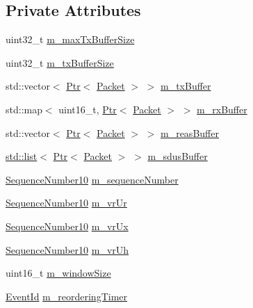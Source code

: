 \subsection*{Private Attributes}
\begin{DoxyCompactItemize}
\item 
uint32\+\_\+t \hyperlink{classns3_1_1LteRlcUm_ad65c6605ca578b8085d9f40f89265ea3}{m\+\_\+max\+Tx\+Buffer\+Size}
\item 
uint32\+\_\+t \hyperlink{classns3_1_1LteRlcUm_a22ba9f6bd98fd3b905155ae0d0182b0d}{m\+\_\+tx\+Buffer\+Size}
\item 
std\+::vector$<$ \hyperlink{classns3_1_1Ptr}{Ptr}$<$ \hyperlink{classns3_1_1Packet}{Packet} $>$ $>$ \hyperlink{classns3_1_1LteRlcUm_ac2c10aa57585dbea3797d651f3dce7be}{m\+\_\+tx\+Buffer}
\item 
std\+::map$<$ uint16\+\_\+t, \hyperlink{classns3_1_1Ptr}{Ptr}$<$ \hyperlink{classns3_1_1Packet}{Packet} $>$ $>$ \hyperlink{classns3_1_1LteRlcUm_aa4611282929afb798d591eafca1e6adb}{m\+\_\+rx\+Buffer}
\item 
std\+::vector$<$ \hyperlink{classns3_1_1Ptr}{Ptr}$<$ \hyperlink{classns3_1_1Packet}{Packet} $>$ $>$ \hyperlink{classns3_1_1LteRlcUm_a9d886a26e8b8318d5d110eb3da537b0c}{m\+\_\+reas\+Buffer}
\item 
\hyperlink{openflow-interface_8h_afd9bcfa176617760671b67580f536fa7}{std\+::list}$<$ \hyperlink{classns3_1_1Ptr}{Ptr}$<$ \hyperlink{classns3_1_1Packet}{Packet} $>$ $>$ \hyperlink{classns3_1_1LteRlcUm_a8c214e654b315fe09e26db669a6af268}{m\+\_\+sdus\+Buffer}
\item 
\hyperlink{classns3_1_1SequenceNumber10}{Sequence\+Number10} \hyperlink{classns3_1_1LteRlcUm_afd06062cf128aecdc2f7c3f29ea8a8ad}{m\+\_\+sequence\+Number}
\item 
\hyperlink{classns3_1_1SequenceNumber10}{Sequence\+Number10} \hyperlink{classns3_1_1LteRlcUm_a04515ea87c413d29a9be9b0a085f5d64}{m\+\_\+vr\+Ur}
\item 
\hyperlink{classns3_1_1SequenceNumber10}{Sequence\+Number10} \hyperlink{classns3_1_1LteRlcUm_a84c0cd7290e00e953d7990e7130f2779}{m\+\_\+vr\+Ux}
\item 
\hyperlink{classns3_1_1SequenceNumber10}{Sequence\+Number10} \hyperlink{classns3_1_1LteRlcUm_aac5ed94d69ff8dbcd7bda1cbe0d3f2f4}{m\+\_\+vr\+Uh}
\item 
uint16\+\_\+t \hyperlink{classns3_1_1LteRlcUm_aa26c2e759abe7309fa1daf32ab7bfa0a}{m\+\_\+window\+Size}
\item 
\hyperlink{classns3_1_1EventId}{Event\+Id} \hyperlink{classns3_1_1LteRlcUm_ae8e4293eb470550bbbc9f98c3a3dde58}{m\+\_\+reordering\+Timer}

\end{DoxyCompactItemize}

